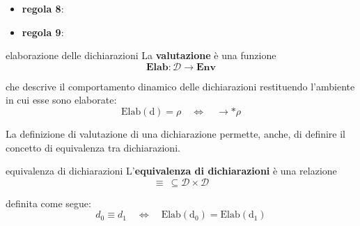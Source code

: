 \begin{itemize}[label=$\triangleright$, itemsep=\smallskipamount]
{\[\begin{prooftree}
            \end{prooftree}
        \]
    }
    \item \textbf{regola 8}:
    \item \textbf{regola 9}:
\end{itemize}

\begin{mydef}{elaborazione delle dichiarazioni}
    La \textbf{valutazione} è una funzione
    \[
        \mathbf{Elab:} \mathcal{D} \to \mathbf{Env}
    \]

    che descrive il comportamento dinamico delle dichiarazioni restituendo l'ambiente in cui esse sono elaborate:
    \[
        \mathrm{Elab(d)} = \rho \quad \Leftrightarrow \quad \to * \rho
    \]
\end{mydef}

La definizione di valutazione di una dichiarazione permette, anche, di definire il concetto di equivalenza tra dichiarazioni.

\begin{mydef}{equivalenza di dichiarazioni}
    L'\textbf{equivalenza di dichiarazioni} è una relazione
    \[
        \equiv \ \subseteq \mathcal{D} \times \mathcal{D}
    \]

    definita come segue:
    \[
        d_0 \equiv d_1 \quad \Leftrightarrow \quad \mathrm{Elab(d_0) = Elab(d_1)}
    \]
\end{mydef}